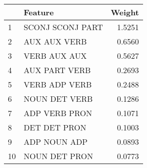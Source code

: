\begin{tabular}{llr}
\toprule
{} &           Feature &  Weight \\
\midrule
1  &  SCONJ SCONJ PART &  1.5251 \\
2  &      AUX AUX VERB &  0.6560 \\
3  &      VERB AUX AUX &  0.5627 \\
4  &     AUX PART VERB &  0.2693 \\
5  &     VERB ADP VERB &  0.2488 \\
6  &     NOUN DET VERB &  0.1286 \\
7  &     ADP VERB PRON &  0.1071 \\
8  &      DET DET PRON &  0.1003 \\
9  &      ADP NOUN ADP &  0.0893 \\
10 &     NOUN DET PRON &  0.0773 \\
\bottomrule
\end{tabular}
